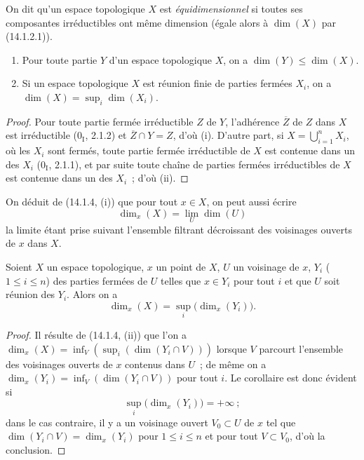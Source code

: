 \begin{definition}[14.1.3]
\label{0.14.1.3-fr}
On dit qu'un espace topologique $X$ est \emph{équidimensionnel} si toutes ses
composantes irréductibles ont même dimension (égale alors à $\dim(X)$ par
(14.1.2.1)).
\end{definition}

\begin{proposition}[14.1.4]
\label{0.14.1.4-fr}
\begin{enumerate}
  \item[\rm(i)] Pour toute partie $Y$ d'un espace topologique $X$, on a
  $\dim(Y)\leq\dim(X)$.
  \item[\rm(ii)] Si un espace topologique $X$ est réunion finie de parties
  fermées $X_i$, on a $\dim(X)=\sup_i\dim(X_i)$.
\end{enumerate}
\end{proposition}

\begin{proof}
Pour toute partie fermée irréductible $Z$ de $Y$, l'adhérence $\overline Z$ de
$Z$ dans $X$ est irréductible ($0_{\mathrm I}$, 2.1.2) et
$\overline Z\cap Y=Z$, d'où (i). D'autre part, si
$X=\bigcup_{i=1}^n X_i$, où les $X_i$ sont fermés, toute partie fermée
irréductible de $X$ est contenue dans un des $X_i$ ($0_{\mathrm I}$, 2.1.1),
et par suite toute chaîne de parties fermées irréductibles de $X$ est contenue
dans un des $X_i$~; d'où (ii).
\end{proof}

On déduit de (14.1.4, (i)) que pour tout $x\in X$, on peut aussi écrire
\[
  \dim_x(X)=\lim_U\dim(U)
  \tag{14.1.4.1}\label{0.14.1.4.1-fr}
\]
la limite étant prise suivant l'ensemble filtrant décroissant des voisinages
ouverts de $x$ dans $X$.

\begin{corollary}[14.1.5]
\label{0.14.1.5-fr}
Soient $X$ un espace topologique, $x$ un point de $X$, $U$ un voisinage de
$x$, $Y_i$ ($1\leq i\leq n$) des parties fermées de $U$ telles que
$x\in Y_i$ pour tout $i$ et que $U$ soit réunion des $Y_i$. Alors on a
\[
  \dim_x(X)=\sup_i\bigl(\dim_x(Y_i)\bigr).
  \tag{14.1.5.1}\label{0.14.1.5.1-fr}
\]
\end{corollary}

\begin{proof}
Il résulte de (14.1.4, (ii)) que l'on a
$\dim_x(X)=\inf_V(\sup_i(\dim(Y_i\cap V)))$ lorsque $V$ parcourt l'ensemble
des voisinages ouverts de $x$ contenus dans $U$~; de même on a
$\dim_x(Y_i)=\inf_V(\dim(Y_i\cap V))$ pour tout $i$. Le corollaire est donc
évident si
\[
  \sup_i\bigl(\dim_x(Y_i)\bigr)=+\infty~;
\]
dans le cas contraire, il y a un voisinage ouvert $V_0\subset U$ de $x$ tel
que $\dim(Y_i\cap V)=\dim_x(Y_i)$ pour $1\leq i\leq n$ et pour tout
$V\subset V_0$, d'où la conclusion.
\end{proof}

